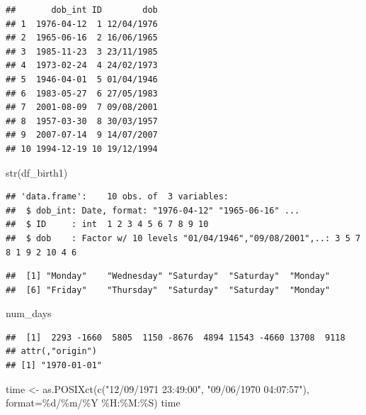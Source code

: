 \documentclass[]{article}
\newenvironment{Shaded}{\begin{snugshade}}{\end{snugshade}}
\newcommand{\AttributeTok}[1]{\textcolor[rgb]{0.77,0.63,0.00}{#1}}
\newcommand{\FunctionTok}[1]{\textcolor[rgb]{0.00,0.00,0.00}{#1}}
\newcommand{\NormalTok}[1]{#1}
\newcommand{\OtherTok}[1]{\textcolor[rgb]{0.56,0.35,0.01}{#1}}
\newcommand{\SpecialCharTok}[1]{\textcolor[rgb]{0.00,0.00,0.00}{#1}}
\newcommand{\StringTok}[1]{\textcolor[rgb]{0.31,0.60,0.02}{#1}}
\begin{document}
\begin{verbatim}
##       dob_int ID        dob
## 1  1976-04-12  1 12/04/1976
## 2  1965-06-16  2 16/06/1965
## 3  1985-11-23  3 23/11/1985
## 4  1973-02-24  4 24/02/1973
## 5  1946-04-01  5 01/04/1946
## 6  1983-05-27  6 27/05/1983
## 7  2001-08-09  7 09/08/2001
## 8  1957-03-30  8 30/03/1957
## 9  2007-07-14  9 14/07/2007
## 10 1994-12-19 10 19/12/1994
\end{verbatim}

\begin{Shaded}
\begin{Highlighting}[]
\FunctionTok{str}\NormalTok{(df\_birth1)}
\end{Highlighting}
\end{Shaded}

\begin{verbatim}
## 'data.frame':    10 obs. of  3 variables:
##  $ dob_int: Date, format: "1976-04-12" "1965-06-16" ...
##  $ ID     : int  1 2 3 4 5 6 7 8 9 10
##  $ dob    : Factor w/ 10 levels "01/04/1946","09/08/2001",..: 3 5 7 8 1 9 2 10 4 6
\end{verbatim}

\begin{Shaded}
\end{Shaded}

\begin{verbatim}
##  [1] "Monday"    "Wednesday" "Saturday"  "Saturday"  "Monday"   
##  [6] "Friday"    "Thursday"  "Saturday"  "Saturday"  "Monday"
\end{verbatim}

\begin{Shaded}
\begin{Highlighting}[]
\NormalTok{num\_days}
\end{Highlighting}
\end{Shaded}

\begin{verbatim}
##  [1]  2293 -1660  5805  1150 -8676  4894 11543 -4660 13708  9118
## attr(,"origin")
## [1] "1970-01-01"
\end{verbatim}

\begin{Shaded}
\begin{Highlighting}[]
\NormalTok{time }\OtherTok{\textless{}{-}} \FunctionTok{as.POSIXct}\NormalTok{(}\FunctionTok{c}\NormalTok{(}\StringTok{"12/09/1971 23:49:00"}\NormalTok{, }\StringTok{"09/06/1970 04:07:57"}\NormalTok{), }\AttributeTok{format=}\StringTok{\textquotesingle{}\%d/\%m/\%Y \%H:\%M:\%S\textquotesingle{}}\NormalTok{)}
\NormalTok{time}
\end{Highlighting}
\end{Shaded}
\end{document}
